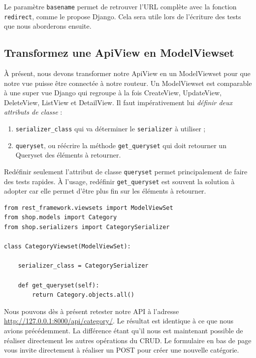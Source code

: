 \begin{theorem}
Le paramètre {\tt basename}  permet de retrouver l’URL complète avec la fonction {\tt redirect}, comme le propose Django. Cela sera utile lors de l’écriture des tests que nous aborderons ensuite.
\end{theorem}

\subsection{Transformez une ApiView en ModelViewset}
À présent, nous devons transformer notre  {\color{monOrange}ApiView}  en un  {\color{monOrange}ModelViewset} pour que notre vue puisse être connectée à notre routeur. Un {\color{monOrange}ModelViewset}  est comparable à une super vue Django qui regroupe à la fois {\color{monOrange}CreateView, UpdateView, DeleteView, ListView}  et {\color{monOrange}DetailView}. Il faut impérativement lui {\em définir deux attributs de classe }:
\begin{enumerate}
\item {\tt serializer\_class}  qui va déterminer le {\tt serializer} à utiliser ;
\item {\tt queryset}, ou réécrire la méthode {\tt get\_queryset}  qui doit retourner un {\color{monOrange}Queryset} des éléments à retourner.
\end{enumerate}
\begin{theorem}
Redéfinir seulement l’attribut de classe {\tt queryset}  permet principalement de faire des tests rapides. À l’usage, redéfinir {\tt get\_queryset}  est souvent la solution à adopter car elle permet d'être plus fin sur les éléments à retourner.
\end{theorem}
\begin{verbatim}
from rest_framework.viewsets import ModelViewSet
from shop.models import Category
from shop.serializers import CategorySerializer
 
class CategoryViewset(ModelViewSet):
 
    serializer_class = CategorySerializer
 
    def get_queryset(self):
        return Category.objects.all()
\end{verbatim}
Nous pouvons dès à présent retester notre API à l’adresse \url{http://127.0.0.1:8000/api/category/}.
Le résultat est identique à ce que nous avions précédemment. La différence étant qu’il nous est maintenant possible de réaliser directement les autres opérations du {\color{monOrange}CRUD}. Le formulaire en bas de page vous invite directement à réaliser un {\color{monOrange}POST} pour créer une nouvelle catégorie.
